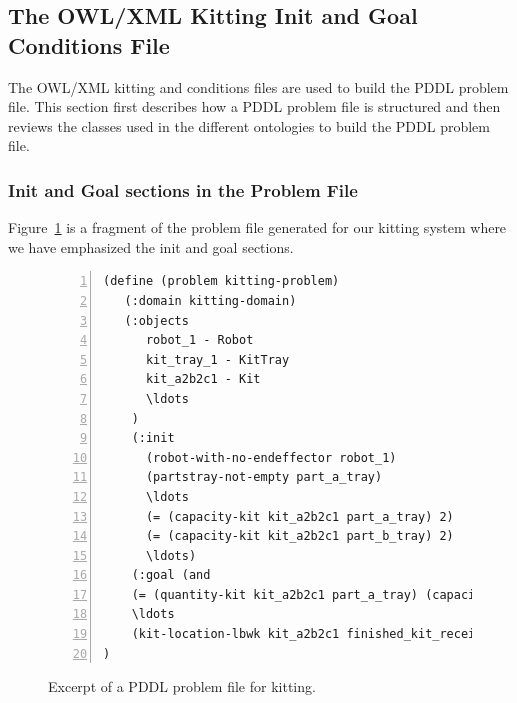 \subsection{The OWL/XML Kitting Init and Goal Conditions File} \label{owlinitgoal}
The OWL/XML kitting  and  conditions files are used to build the PDDL
problem file. This section first describes how a PDDL problem file is structured and then
reviews the classes used in the different ontologies to build the PDDL problem file.

\subsubsection{Init and Goal sections in the Problem File}
Figure~\ref{fig:problem} is a fragment of the problem file generated for our kitting
system where we have emphasized the init and goal sections.

\begin{figure}[t!h!]
\begin{minipage}{.7\paperwidth}
\begin{list}{}{\setlength{\leftmargin}{1em}}\item\small
\begin{Verbatim}[commandchars=\\\{\},fontsize=\scriptsize, numbers=left, numbersep=2pt]
(define (problem kitting-problem)
   (:domain kitting-domain)
   (:objects
      robot_1 - Robot
      kit_tray_1 - KitTray
      kit_a2b2c1 - Kit
      \ldots
	)
    (:init
      (robot-with-no-endeffector robot_1)
      (partstray-not-empty part_a_tray)
      \ldots
      (= (capacity-kit kit_a2b2c1 part_a_tray) 2)
      (= (capacity-kit kit_a2b2c1 part_b_tray) 2)
      \ldots)
    (:goal (and
    (= (quantity-kit kit_a2b2c1 part_a_tray) (capacity-kit kit_a2b2c1 part_a_tray))
    \ldots
    (kit-location-lbwk kit_a2b2c1 finished_kit_receiver))
)
\end{Verbatim}
\end{list}
\end{minipage}
\caption{Excerpt of a PDDL problem file for kitting.}
\label{fig:problem}
\end{figure}

